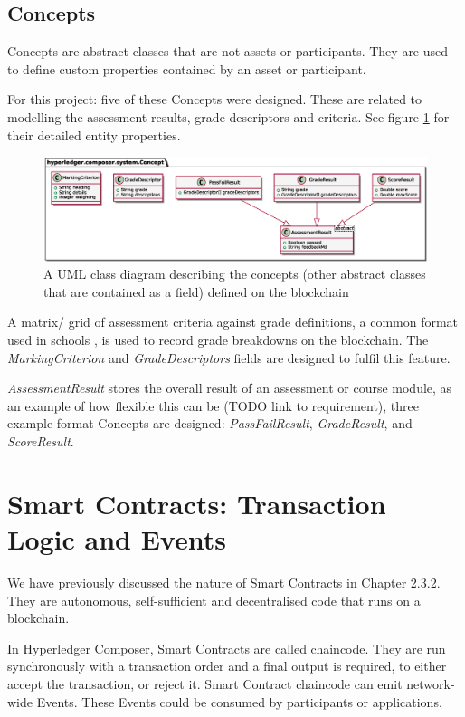 \subsection{Concepts}

Concepts are abstract classes that are not assets or participants. They are used to define custom properties contained by an asset or participant.

For this project: five of these Concepts were designed. These are related to modelling the assessment results, grade descriptors and criteria.
See figure \ref{fig:concepts} for their detailed entity properties.

\begin{figure}[!ht]
	\centering
	\includegraphics[width=1.0\textwidth]{concepts}
	\caption[Concepts Class Diagram]
	{A UML class diagram describing the concepts (other abstract classes that are contained as a field) defined on the blockchain}
	\label{fig:concepts}
\end{figure}

A matrix/ grid of assessment criteria against grade definitions, a common format used in schools \citep[p.102]{bryan2006innovative},
is used to record grade breakdowns on the blockchain. The \textit{MarkingCriterion} and \textit{GradeDescriptors} fields are designed to
fulfil this feature.

\textit{AssessmentResult} stores the overall result of an assessment or course module, as an example of how flexible this can be (TODO link to requirement),
three example format Concepts are designed: \textit{PassFailResult}, \textit{GradeResult}, and \textit{ScoreResult}.

\section{Smart Contracts: Transaction Logic and Events}

We have previously discussed the nature of Smart Contracts in Chapter 2.3.2. They are autonomous, self-sufficient and
decentralised code that runs on a blockchain.

In Hyperledger Composer, Smart Contracts are called chaincode.
They are run synchronously with a transaction order and a final output is required, to either accept the transaction, or reject it.
Smart Contract chaincode can emit network-wide Events. These Events could be consumed by participants or applications.

